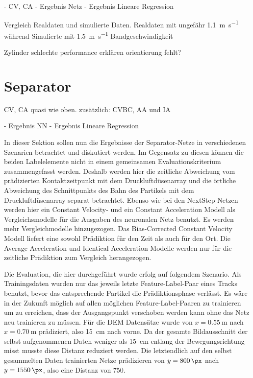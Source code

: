 \color{blue}
- CV, CA
- Ergebnis Netz
- Ergebnis Lineare Regression


Vergleich Realdaten und simulierte Daten.
Realdaten mit ungefähr \SI{1.1}{\meter\per\second} während Simulierte mit \SI{1.5}{\metre\per\second} Bandgeschwindigkeit 

Zylinder schlechte performance erklären \textrightarrow orientierung fehlt?
\color{black}

\section{Separator}

\color{blue}
CV, CA quasi wie oben.
zusätzlich: CVBC, AA und IA

- Ergebnis NN
- Ergebnis Lineare Regression
\color{black}



In dieser Sektion sollen nun die Ergebnisse der Separator-Netze in verschiedenen Szenarien betrachtet und diskutiert werden.
Im Gegensatz zu diesen können die beiden Labelelemente nicht in einem gemeinsamen Evaluationskriterium zusammengefasst werden.
Deshalb werden hier die zeitliche Abweichung vom prädizierten Kontaktzeitpunkt mit dem Druckluftdüsenarray und die örtliche Abweichung des Schnittpunkts des Bahn des Partikels mit dem Druckluftdüsenarray separat betrachtet.
Ebenso wie bei den NextStep-Netzen werden hier ein Constant Velocity- und ein Constant Acceleration Modell als Vergleichsmodelle für die Ausgaben des neuronalen Netz benutzt.
Es werden mehr Vergleichmodelle hinzugezogen. 
Das Bias-Corrected Constant Velocity Modell liefert eine sowohl Prädiktion für den Zeit als auch für den Ort.
Die Average Acceleration und Identical Acceleration Modelle werden nur für die zeitliche Prädiktion zum Vergleich herangezogen.

Die Evaluation, die hier durchgeführt wurde erfolg auf folgendem Szenario.
Als Trainingsdaten wurden nur das jeweils letzte Feature-Label-Paar eines Tracks benutzt, bevor das entsprechende Partikel die Prädiktionsphase verlässt.
Es wäre in der Zukunft möglich auf allen möglichen Feature-Label-Paaren zu trainieren um zu erreichen, dass der Ausgangspunkt verschoben werden kann ohne das Netz neu trainieren zu müssen.
Für die DEM Datensätze wurde von \(x = \SI{0.55}{\meter}\) nach \(x = \SI{0.70}{\meter}\) prädiziert, also \SI{15}{\centi\meter} nach vorne.
Da der gesamte Bildausschnitt der selbst aufgenommenen Daten weniger als \SI{15}{\centi\meter} entlang der Bewegungsrichtung misst musste diese Distanz reduziert werden.
Die letztendlich auf den selbst gesammelten Daten trainierten Netze prädizieren von \(y = \SI{800}{\px}\) nach \(y = \SI{1550}{\px}\), also eine Distanz von \SI{750}{\px}.




